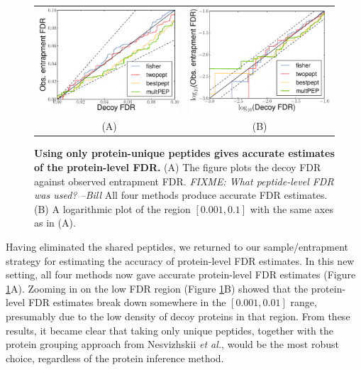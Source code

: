 \documentclass{article}
\begin{document}
\begin{figure}
\begin{center}
\begin{tabular}{cc} 
\includegraphics[width=0.45\linewidth]{./img/unique-pept-accuracy} &
\includegraphics[width=0.45\linewidth]{./img/unique-pept-accuracy-log}\\
(A) & (B)
\end{tabular}
\caption{\label{fig:unique-accuracy}\textbf{Using only protein-unique
    peptides gives accurate estimates of the protein-level FDR.}
  (A) The figure plots the decoy FDR against observed entrapment FDR.
  {\em FIXME: What peptide-level FDR was used? --Bill}
  All four methods produce accurate FDR estimates. (B) A logarithmic 
  plot of the region $[0.001, 0.1]$ with the same axes as in (A).}
\end{center}
\end{figure}

Having eliminated the shared peptides, we returned to our
sample/entrapment strategy for estimating the accuracy of
protein-level FDR estimates.  In this new setting, all four methods
now gave accurate protein-level FDR estimates (Figure
\ref{fig:unique-accuracy}A).  Zooming in on the low FDR region (Figure
\ref{fig:unique-accuracy}B) showed that the protein-level FDR
estimates break down somewhere in the $[0.001, 0.01]$ range,
presumably due to the low density of decoy proteins in that region.
From these results, it became clear that taking only unique peptides,
together with the protein grouping approach from Nesvizhskii {\em et
  al.}, would be the most robust choice, regardless of the protein
inference method.
\end{document}
